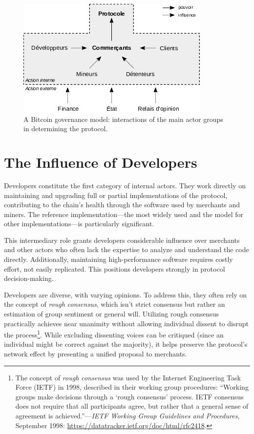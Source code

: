 \documentclass[
  a5paper,
  smalldemyvopaper,10pt,twoside,onecolumn,openright,extrafontsizes,hidelinks]{memoir}
\begin{document}
\begin{figure}[H]

{\centering \includegraphics{chapters/img/bitcoin-governance-model.png}

}

\caption{A Bitcoin governance model: interactions of the main actor
groups in determining the protocol.}

\end{figure}%

\section*{The Influence of
Developers}\label{the-influence-of-developers}


Developers constitute the first category of internal actors. They work
directly on maintaining and upgrading full or partial implementations of
the protocol, contributing to the chain's health through the software
used by merchants and miners. The reference implementation---the most
widely used and the model for other implementations---is particularly
significant.

This intermediary role grants developers considerable influence over
merchants and other actors who often lack the expertise to analyze and
understand the code directly. Additionally, maintaining high-performance
software requires costly effort, not easily replicated. This positions
developers strongly in protocol decision-making.

Developers are diverse, with varying opinions. To address this, they
often rely on the concept of \emph{rough consensus}, which isn't strict
consensus but rather an estimation of group sentiment or general will.
Utilizing rough consensus practically achieves near unanimity without
allowing individual dissent to disrupt the process\footnote{The concept
  of \emph{rough consensus} was used by the Internet Engineering Task
  Force (IETF) in 1998, described in their working group procedures:
  ``Working groups make decisions through a `rough consensus' process.
  IETF consensus does not require that all participants agree, but
  rather that a general sense of agreement is achieved.''---\emph{IETF
  Working Group Guidelines and Procedures}, September 1998:
  \url{https://datatracker.ietf.org/doc/html/rfc2418}.}. While excluding
dissenting voices can be critiqued (since an individual might be correct
against the majority), it helps preserve the protocol's network effect
by presenting a unified proposal to merchants.
\end{document}
